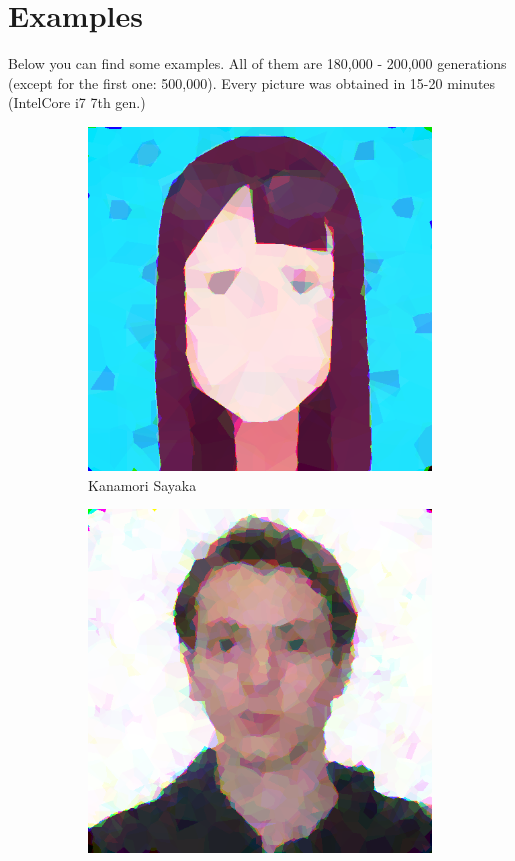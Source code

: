 \documentclass{article}
\begin{document}
\section{Examples}
Below you can find some examples. All of them are 180,000 - 200,000 generations (except for the first one: 500,000). Every picture was obtained in 15-20 minutes (IntelCore i7 7th gen.)
\begin{figure}[ht]
   	 \centering
     \begin{subfigure}[b]{0.45\textwidth}
         \centering
         \includegraphics[width=\textwidth]{latex_src/voronoi6.png}
         \caption{Kanamori Sayaka}
     \end{subfigure}
     \hfill
     \begin{subfigure}[b]{0.45\textwidth}
         \centering
         \includegraphics[width=\textwidth]{latex_src/voronoi19.png}

\end{subfigure}
\end{figure}
\end{document}
